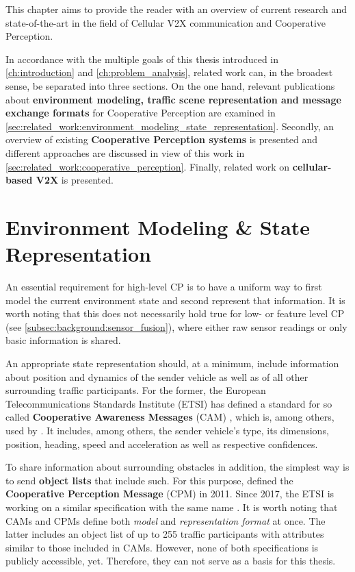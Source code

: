 This chapter aims to provide the reader with an overview of current research and state-of-the-art in the field of Cellular V2X communication and Cooperative Perception.
\par
\bigskip

In accordance with the multiple goals of this thesis introduced in \autoref{ch:introduction} and \autoref{ch:problem_analysis}, related work can, in the broadest sense, be separated into three sections. On the one hand, relevant publications about \textbf{environment modeling, traffic scene representation and message exchange formats} for Cooperative Perception are examined in \autoref{sec:related_work:environment_modeling_state_representation}. Secondly, an overview of existing \textbf{Cooperative Perception systems} is presented and different approaches are discussed in view of this work in \autoref{sec:related_work:cooperative_perception}. Finally, related work on \textbf{cellular-based V2X} is presented.

\section{Environment Modeling \& State Representation}
\label{sec:related_work:environment_modeling_state_representation}
An essential requirement for high-level CP is to have a uniform way to first model the current environment state and second represent that information. It is worth noting that this does not necessarily hold true for low- or feature level CP (see \autoref{subsec:background:sensor_fusion}), where either raw sensor readings or only basic information is shared.

An appropriate state representation should, at a minimum, include information about position and dynamics of the sender vehicle as well as of all other surrounding traffic participants. For the former, the European Telecommunications Standards Institute (ETSI) has defined a standard for so called \textbf{Cooperative Awareness Messages} (CAM) \cite{EuropeanTelecommunicationsStandardsInstituteETSI2011}, which is, among others, used by \cite{Rauch2011}. It includes, among others, the sender vehicle's type, its dimensions, position, heading, speed and acceleration as well as respective confidences.

To share information about surrounding obstacles in addition, the simplest way is to send \textbf{object lists} that include such. For this purpose, \cite{Rauch2011} defined the \textbf{Cooperative Perception Message} (CPM) in 2011. Since 2017, the ETSI is working on a similar specification with the same name \cite{EuropeanTelecommunicationsStandardsInstituteETSI2019}. It is worth noting that CAMs and CPMs define both \textit{model} and \textit{representation format} at once. The latter includes an object list of up to 255 traffic participants \cite{Thandavarayan2019} with attributes similar to those included in CAMs. However, none of both specifications is publicly accessible, yet. Therefore, they can not serve as a basis for this thesis.

